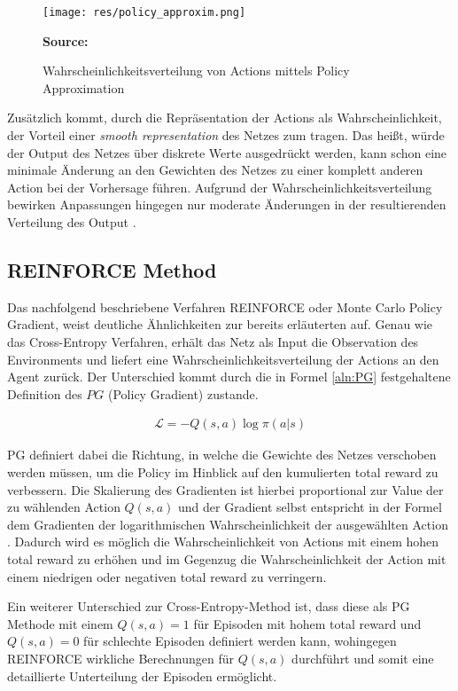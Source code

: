 \documentclass[11pt]{scrartcl}
\newcommand{\source}[1]{\vspace{-5pt} \caption*{\hfill \textbf{Source:} {#1}} }
\begin{document}
\begin{figure}[htp]
\centering
\texttt{[image: res/policy\_approxim.png]}
\caption{Wahrscheinlichkeitsverteilung von Actions mittels Policy Approximation}
\source{\cite[~S.243 - Chapter 9 - Figure 1]{L2018}}
\label{fig:prob-dist-pg}
\end{figure}

Zusätzlich kommt, durch die Repräsentation der Actions als Wahrscheinlichkeit, der Vorteil einer
\textit{smooth representation} des Netzes zum tragen. Das heißt, würde der Output des Netzes über
diskrete Werte ausgedrückt werden, kann schon eine minimale Änderung an den Gewichten des Netzes 
zu einer komplett anderen Action bei der Vorhersage führen. Aufgrund der
Wahrscheinlichkeitsverteilung bewirken Anpassungen hingegen nur moderate Änderungen in der
resultierenden Verteilung des Output \cite[~S.243]{L2018}.


\subsection{REINFORCE Method}
Das nachfolgend beschriebene Verfahren REINFORCE oder Monte Carlo Policy Gradient, weist
deutliche Ähnlichkeiten zur bereits erläuterten  auf.
Genau wie das Cross-Entropy Verfahren, erhält das Netz als Input die Observation des
Environments und liefert eine Wahrscheinlichkeitsverteilung der Actions an den Agent
zurück. Der Unterschied kommt durch die in Formel \ref{aln:PG} festgehaltene Definition
des $PG$ (Policy Gradient) zustande.

\begin{align}
\mathcal{L}=-Q(s,a)\log\pi(a|s)
\label{aln:PG}
\end{align}

PG definiert dabei die Richtung, in welche die Gewichte des Netzes verschoben werden müssen,
um die Policy im Hinblick auf den kumulierten total reward zu verbessern. Die Skalierung des
Gradienten ist hierbei proportional zur Value der zu wählenden Action $Q(s,a)$
und der Gradient selbst entspricht in der Formel dem Gradienten der logarithmischen
Wahrscheinlichkeit der ausgewählten Action \cite[~S.244]{L2018}. Dadurch wird es möglich
die Wahrscheinlichkeit von Actions mit einem hohen total reward zu erhöhen und im Gegenzug
die Wahrscheinlichkeit der Action mit einem niedrigen oder negativen total reward zu
verringern.

Ein weiterer Unterschied zur Cross-Entropy-Method ist, dass diese als PG Methode mit einem
$Q(s,a)=1$ für Episoden mit hohem total reward und $Q(s,a)=0$ für schlechte Episoden
definiert werden kann, wohingegen REINFORCE wirkliche Berechnungen für $Q(s,a)$ durchführt
und somit eine detaillierte Unterteilung der Episoden ermöglicht.
\end{document}
